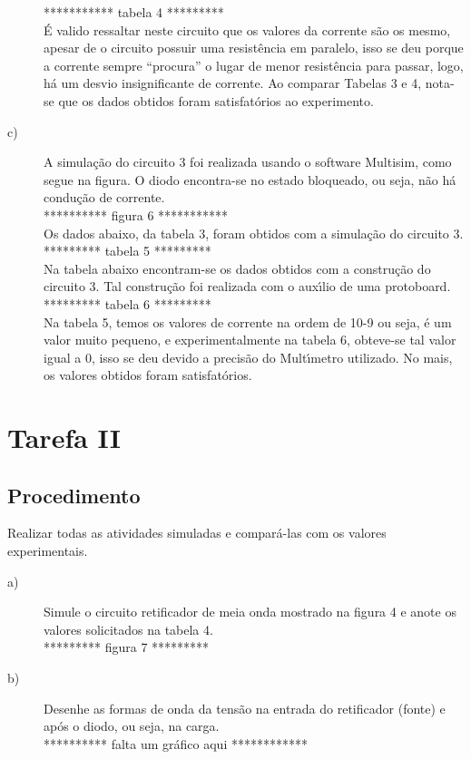 \begin{description}
      *********** tabela 4 ********* \\

      \'{E} valido ressaltar neste circuito que os valores da corrente s\~{a}o os mesmo, apesar de o circuito possuir uma resist\^{e}ncia em paralelo, isso se deu porque a corrente sempre “procura” o lugar de menor resist\^{e}ncia para passar, logo, h\'{a} um desvio insignificante de corrente. Ao comparar Tabelas 3 e 4, nota-se que os dados obtidos foram satisfat\'{o}rios ao experimento.

  \item[c)]A simula\c{c}\~{a}o do circuito 3 foi realizada usando o software Multisim, como segue na figura. O diodo encontra-se no estado bloqueado, ou seja, n\~{a}o h\'{a} condu\c{c}\~{a}o de corrente. \\

      ********** figura 6 *********** \\

      Os dados abaixo, da tabela 3, foram obtidos com a simula\c{c}\~{a}o do circuito 3. \\

      ********* tabela 5 ********* \\

      Na tabela abaixo encontram-se os dados obtidos com a constru\c{c}\~{a}o do circuito 3. Tal constru\c{c}\~{a}o foi realizada com o aux\'{\i}lio de uma protoboard. \\

      ********* tabela 6 ********* \\

      Na tabela 5, temos os valores de corrente na ordem de 10-9 ou seja, \'{e} um valor muito pequeno, e experimentalmente na tabela 6, obteve-se tal valor igual a 0, isso se deu devido a precis\~{a}o do Mult\'{\i}metro utilizado. No mais, os valores obtidos foram satisfat\'{o}rios.
\end{description}

\section{Tarefa II}
\subsection{Procedimento}
Realizar todas as atividades simuladas e compar\'{a}-las com os valores experimentais.

\begin{description}
  \item[a)]Simule o circuito retificador de meia onda mostrado na figura 4 e anote os valores solicitados na tabela 4. \\

      ********* figura 7 ********* \\

  \item[b)]Desenhe as formas de onda da tens\~{a}o na entrada do retificador (fonte) e ap\'{o}s o diodo, ou seja, na carga. \\


      ********** falta um gr\'{a}fico aqui ************
\end{description}

